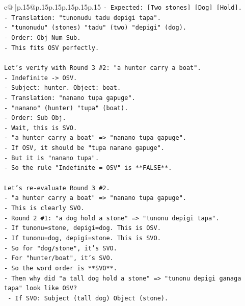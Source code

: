 \documentclass{article}
\begin{document}
{\begin{supertabular}{c@{$\;$}|p{.15\linewidth}@{}p{.15\linewidth}p{.15\linewidth}p{.15\linewidth}p{.15\linewidth}p{.15\linewidth}}
{{{\texttt{{-} Expected: {[}Two stones{]} {[}Dog{]} {[}Hold{]}.} \\
\texttt{{-} Translation: "tunonudu tadu depigi tapa".} \\
\texttt{{-} "tunonudu" (stones) "tadu" (two) "depigi" (dog).} \\
\texttt{{-} Order: Obj Num Sub.} \\
\texttt{{-} This fits OSV perfectly.} \\
\\ 
\texttt{Let's verify with Round 3 \#2: "a hunter carry a boat".} \\
\texttt{{-} Indefinite {-}> OSV.} \\
\texttt{{-} Subject: hunter. Object: boat.} \\
\texttt{{-} Translation: "nanano tupa gapuge".} \\
\texttt{{-} "nanano" (hunter) "tupa" (boat).} \\
\texttt{{-} Order: Sub Obj.} \\
\texttt{{-} Wait, this is SVO.} \\
\texttt{{-} "a hunter carry a boat" => "nanano tupa gapuge".} \\
\texttt{{-} If OSV, it should be "tupa nanano gapuge".} \\
\texttt{{-} But it is "nanano tupa".} \\
\texttt{{-} So the rule "Indefinite = OSV" is **FALSE**.} \\
\\ 
\texttt{Let's re{-}evaluate Round 3 \#2.} \\
\texttt{{-} "a hunter carry a boat" => "nanano tupa gapuge".} \\
\texttt{{-} This is clearly SVO.} \\
\texttt{{-} Round 2 \#1: "a dog hold a stone" => "tunonu depigi tapa".} \\
\texttt{{-} If tunonu=stone, depigi=dog. This is OSV.} \\
\texttt{{-} If tunonu=dog, depigi=stone. This is SVO.} \\
\texttt{{-} So for "dog/stone", it's SVO.} \\
\texttt{{-} For "hunter/boat", it's SVO.} \\
\texttt{{-} So the word order is **SVO**.} \\
\texttt{{-} Then why did "a tall dog hold a stone" => "tunonu depigi ganaga tapa" look like OSV?} \\
\texttt{  {-} If SVO: Subject (tall dog) Object (stone).} \\
}}}
\end{supertabular}}
\end{document}

